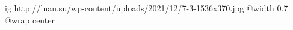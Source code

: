  
 
 
 
 

\ifcmt
  ig http://lnau.su/wp-content/uploads/2021/12/7-3-1536x370.jpg
  @width 0.7
	@wrap center
\fi
